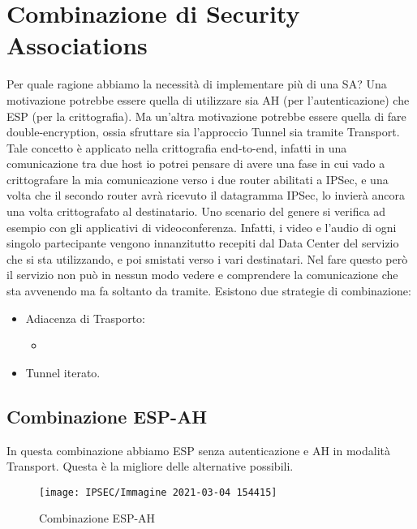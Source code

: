\documentclass[14pt]{extreport}
\begin{document}
\section{Combinazione di Security Associations}
Per quale ragione abbiamo la necessità di implementare più di una SA? Una motivazione potrebbe essere quella di utilizzare sia AH (per l'autenticazione) che ESP (per la crittografia). Ma un'altra motivazione potrebbe essere quella di fare double-encryption, ossia sfruttare sia l'approccio Tunnel sia tramite Transport. 
Tale concetto è applicato nella crittografia end-to-end, infatti in una comunicazione tra due host io potrei pensare di avere una fase in cui vado a crittografare la mia comunicazione verso i due router abilitati a IPSec, e una volta che il secondo router avrà ricevuto il datagramma IPSec, lo invierà ancora una volta crittografato al destinatario. Uno scenario del genere si verifica ad esempio con gli applicativi di videoconferenza. Infatti, i video e l'audio di ogni singolo partecipante vengono innanzitutto recepiti dal Data Center del servizio che si sta utilizzando, e poi smistati verso i vari destinatari. Nel fare questo però il servizio non può in nessun modo vedere e comprendere la comunicazione che sta avvenendo ma fa soltanto da tramite.
Esistono due strategie di combinazione:

\begin{itemize}
    \item Adiacenza di Trasporto:
    
    \begin{itemize}
        \item 
    \end{itemize}
    
    \item Tunnel iterato.
\end{itemize}



\subsection{Combinazione ESP-AH}



In questa combinazione abbiamo ESP senza autenticazione e AH in modalità Transport. Questa è la migliore delle alternative possibili.




\begin{figure}[H]
    \centering
    \texttt{[image: IPSEC/Immagine 2021-03-04 154415]}
    \caption{Combinazione ESP-AH}
    \label{IPSEC14}
\end{figure}
\end{document}
